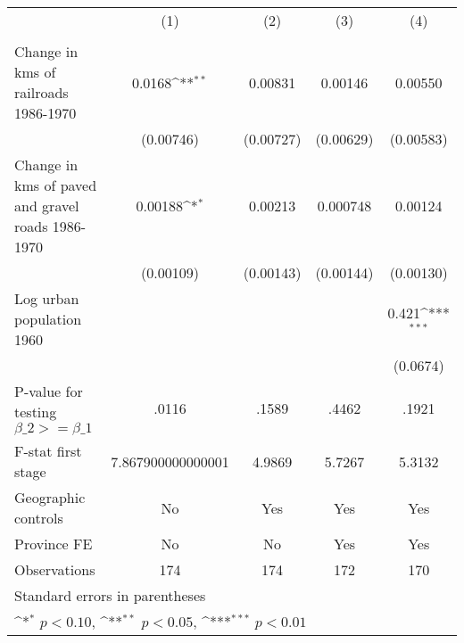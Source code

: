 {
\def\sym#1{\ifmmode^{#1}\else\(^{#1}\)\fi}
\begin{tabular}{l*{4}{c}}
\hline\hline
                &\multicolumn{1}{c}{(1)}&\multicolumn{1}{c}{(2)}&\multicolumn{1}{c}{(3)}&\multicolumn{1}{c}{(4)}\\
                &\multicolumn{1}{c}{}&\multicolumn{1}{c}{}&\multicolumn{1}{c}{}&\multicolumn{1}{c}{}\\
\hline
Change in kms of railroads 1986-1970&   0.0168\sym{**} &  0.00831         &  0.00146         &  0.00550         \\
                &(0.00746)         &(0.00727)         &(0.00629)         &(0.00583)         \\
[1em]
Change in kms of paved and gravel roads 1986-1970&  0.00188\sym{*}  &  0.00213         & 0.000748         &  0.00124         \\
                &(0.00109)         &(0.00143)         &(0.00144)         &(0.00130)         \\
[1em]
Log urban population 1960&                  &                  &                  &    0.421\sym{***}\\
                &                  &                  &                  & (0.0674)         \\
\hline
P-value for testing $\beta\_{2} >= \beta\_{1}$&    .0116         &    .1589         &    .4462         &    .1921         \\
F-stat first stage&7.867900000000001         &   4.9869         &   5.7267         &   5.3132         \\
Geographic controls&       No         &      Yes         &      Yes         &      Yes         \\
Province FE     &       No         &       No         &      Yes         &      Yes         \\
Observations    &      174         &      174         &      172         &      170         \\
\hline\hline
\multicolumn{5}{l}{\footnotesize Standard errors in parentheses}\\
\multicolumn{5}{l}{\footnotesize \sym{*} \(p<0.10\), \sym{**} \(p<0.05\), \sym{***} \(p<0.01\)}\\
\end{tabular}
}
